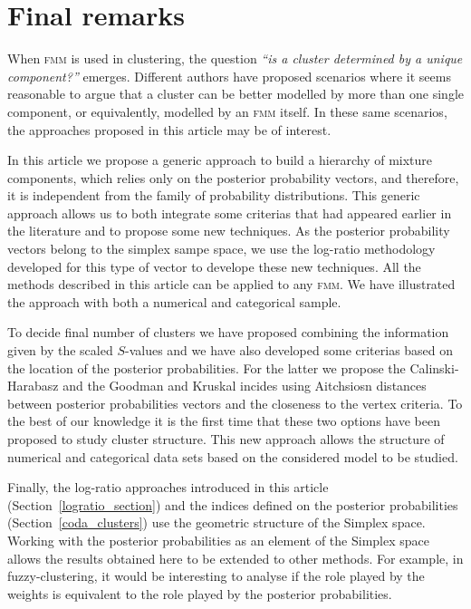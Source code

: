 \documentclass[submit]{smj}
\theoremstyle{definition}
\newcommand{\fmm}{\textsc{fmm}\xspace}
\begin{document}
\section{Final remarks}\label{remarks}

 When \fmm is used in clustering, the question \textit{``is a cluster determined by a unique component?''} emerges. Different authors have proposed scenarios where it seems reasonable to argue that a cluster can be better modelled by more than one single component, or equivalently, modelled by an \fmm itself. In these same scenarios, the approaches proposed in this article may be of interest.

In this article we propose a generic approach to build a hierarchy of mixture components, which relies only on the posterior probability vectors, and therefore, it is independent from the family of probability distributions. This generic approach allows us to both integrate some criterias that had appeared earlier in the literature and to propose some new techniques. As the posterior probability vectors belong to the simplex sampe space, we use the log-ratio methodology developed for this type of vector to develope these new techniques. All the methods described in this article can be applied to any \fmm. We have illustrated the approach with both a numerical and categorical sample. 

To decide final number of clusters we have proposed combining the information given by the scaled $S$-values and we have also developed some criterias based on the location of the posterior probabilities. For the latter we propose the Calinski-Harabasz and the Goodman and Kruskal incides using Aitchsiosn distances between posterior probabilities vectors and the closeness to the vertex criteria. To the best of our knowledge it is the first time that these two options have been proposed to study cluster structure. This new approach allows the structure of numerical and categorical data sets based on the considered model to be studied.

Finally, the log-ratio approaches introduced in this article (Section~\ref{logratio_section}) and the indices defined on the posterior probabilities (Section~\ref{coda_clusters}) use the geometric structure of the Simplex space. Working with the posterior probabilities as an element of the Simplex space allows  the results obtained here to be extended to other methods. For example, in fuzzy-clustering, it would be interesting to analyse if  the role played by the weights is equivalent to the role played by the posterior probabilities. 
\end{document}
